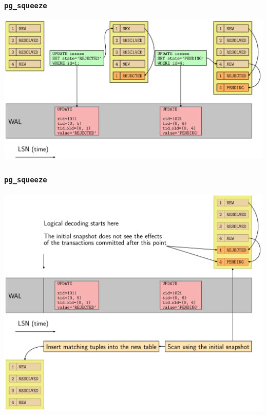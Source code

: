 \begin{frame}
  \frametitle{\texttt{pg\_squeeze}}
  \begin{center}
    \includegraphics[height=\sizeforimages\textheight]{images/pg_squeeze_01.png}
  \end{center}
\end{frame}

\begin{frame}
  \frametitle{\texttt{pg\_squeeze}}
  \begin{center}
    \includegraphics[height=\sizeforimages\textheight]{images/pg_squeeze_02.png}
  \end{center}
\end{frame}

